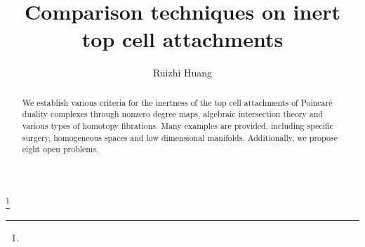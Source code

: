 \documentclass[a4]{amsart}
\theoremstyle{definition}
\begin{document}
\begin{sloppypar}

\title{Comparison techniques on inert top cell attachments} 

\author{Ruizhi Huang} 
\address{Institute of Mathematics, Academy of Mathematics and Systems Science, 
 Chinese Academy of Sciences, Beijing 100190, China} 
   \thanks{}
   







\keywords{}
\date{}







\begin{abstract} 
We establish various criteria for the inertness of the top cell attachments of Poincar\'{e} duality complexes through nonzero degree maps, algebraic intersection theory and various types of homotopy fibrations. Many examples are provided, including specific surgery, homogeneous spaces and low dimensional manifolds. Additionally, we propose eight open problems. 
\end{abstract}

\maketitle

\setcounter{tocdepth}{1}
\tableofcontents
\newpage



\end{sloppypar}
\end{document}
